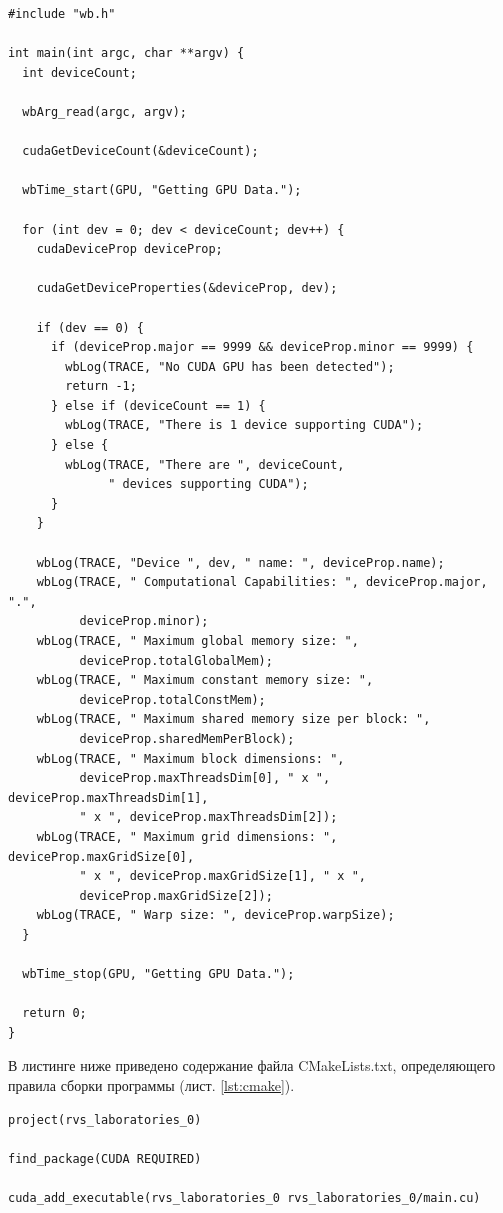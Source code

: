 \documentclass[14pt]{extarticle}
\newenvironment{code}{\captionsetup{type=listing, belowskip=-14pt plus 3pt minus 0pt}}{}
\begin{document}
\begin{code}    
\caption{Содержание rvs\_laboratories\_0/main.cu\label{lst:main}}
\begin{verbatim}
#include "wb.h"

int main(int argc, char **argv) {
  int deviceCount;

  wbArg_read(argc, argv);

  cudaGetDeviceCount(&deviceCount);

  wbTime_start(GPU, "Getting GPU Data.");

  for (int dev = 0; dev < deviceCount; dev++) {
    cudaDeviceProp deviceProp;

    cudaGetDeviceProperties(&deviceProp, dev);

    if (dev == 0) {
      if (deviceProp.major == 9999 && deviceProp.minor == 9999) {
        wbLog(TRACE, "No CUDA GPU has been detected");
        return -1;
      } else if (deviceCount == 1) {
        wbLog(TRACE, "There is 1 device supporting CUDA");
      } else {
        wbLog(TRACE, "There are ", deviceCount,
              " devices supporting CUDA");
      }
    }

    wbLog(TRACE, "Device ", dev, " name: ", deviceProp.name);
    wbLog(TRACE, " Computational Capabilities: ", deviceProp.major, ".",
          deviceProp.minor);
    wbLog(TRACE, " Maximum global memory size: ",
          deviceProp.totalGlobalMem);
    wbLog(TRACE, " Maximum constant memory size: ",
          deviceProp.totalConstMem);
    wbLog(TRACE, " Maximum shared memory size per block: ",
          deviceProp.sharedMemPerBlock);
    wbLog(TRACE, " Maximum block dimensions: ",
          deviceProp.maxThreadsDim[0], " x ", deviceProp.maxThreadsDim[1],
          " x ", deviceProp.maxThreadsDim[2]);
    wbLog(TRACE, " Maximum grid dimensions: ", deviceProp.maxGridSize[0],
          " x ", deviceProp.maxGridSize[1], " x ",
          deviceProp.maxGridSize[2]);
    wbLog(TRACE, " Warp size: ", deviceProp.warpSize);
  }

  wbTime_stop(GPU, "Getting GPU Data.");

  return 0;
}
\end{verbatim}
\end{code}

\pagebreak

В листинге ниже приведено содержание файла CMakeLists.txt, определяющего правила сборки программы (лист. \ref{lst:cmake}).

\begin{code}    
\caption{Содержание CMakeLists.txt\label{lst:cmake}}
\begin{verbatim}
project(rvs_laboratories_0)

find_package(CUDA REQUIRED)

cuda_add_executable(rvs_laboratories_0 rvs_laboratories_0/main.cu)
\end{verbatim}
\end{code}
\end{document}
